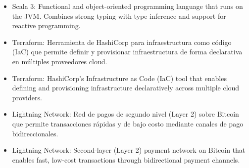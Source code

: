 \documentclass[paper=a4,fontsize=11pt]{scrartcl} %
\begin{document}
{\begin{itemize}
\item{Scala 3: Functional and object-oriented programming language that runs on the JVM. Combines strong typing with type inference and support for reactive programming.}
\item{Terraform: Herramienta de HashiCorp para infraestructura como código (IaC) que permite definir y provisionar infraestructura de forma declarativa en múltiples proveedores cloud.}
\item{Terraform: HashiCorp's Infrastructure as Code (IaC) tool that enables defining and provisioning infrastructure declaratively across multiple cloud providers.}
\item{Lightning Network: Red de pagos de segundo nivel (Layer 2) sobre Bitcoin que permite transacciones rápidas y de bajo costo mediante canales de pago bidireccionales.}
\item{Lightning Network: Second-layer (Layer 2) payment network on Bitcoin that enables fast, low-cost transactions through bidirectional payment channels.}
\end{itemize}
}
\end{document}
